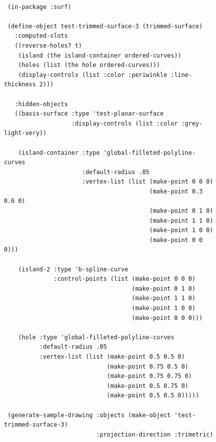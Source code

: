 \documentclass [11pt]{book}
\begin{document}
\begin{itemize}
\begin{description}
\end{description}




\begin{figure}
\begin{lrbox}{\boxedverb}
\begin{minipage}{\linewidth}
{\small

\begin{verbatim}

 (in-package :surf)
                  
 (define-object test-trimmed-surface-3 (trimmed-surface)
   :computed-slots
   ((reverse-holes? t)
    (island (the island-container ordered-curves))
    (holes (list (the hole ordered-curves)))
    (display-controls (list :color :periwinkle :line-thickness 2)))
  
   :hidden-objects
   ((basis-surface :type 'test-planar-surface
                   :display-controls (list :color :grey-light-very))
   
    (island-container :type 'global-filleted-polyline-curves
                      :default-radius .05
                      :vertex-list (list (make-point 0 0 0)
                                         (make-point 0.3 0.6 0)
                                         (make-point 0 1 0)
                                         (make-point 1 1 0)
                                         (make-point 1 0 0)
                                         (make-point 0 0 0)))
   
    (island-2 :type 'b-spline-curve 
              :control-points (list (make-point 0 0 0)
                                    (make-point 0 1 0)
                                    (make-point 1 1 0)
                                    (make-point 1 0 0)
                                    (make-point 0 0 0)))
   
    (hole :type 'global-filleted-polyline-curves
          :default-radius .05
          :vertex-list (list (make-point 0.5 0.5 0)
                             (make-point 0.75 0.5 0)
                             (make-point 0.75 0.75 0)
                             (make-point 0.5 0.75 0)
                             (make-point 0.5 0.5 0)))))

 (generate-sample-drawing :objects (make-object 'test-trimmed-surface-3)
                          :projection-direction :trimetric)



\end{verbatim}}
\end{minipage}
\end{lrbox}
\fbox{\usebox{\boxedverb}}


\end{figure}
\end{itemize}
\end{document}
